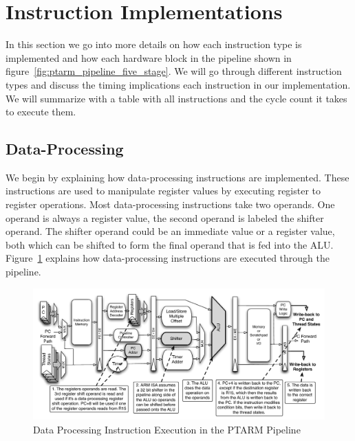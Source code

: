 \section{Instruction Implementations}
\label{sec:ptarm_instructions}
In this section we go into more details on how each instruction type is implemented and how each hardware block in the pipeline shown in figure~\ref{fig:ptarm_pipeline_five_stage}. 
We will go through different instruction types and discuss the timing implications each instruction in our implementation.
We will summarize with a table with all instructions and the cycle count it takes to execute them.
   
\subsection{Data-Processing}
We begin by explaining how data-processing instructions are implemented.
These instructions are used to manipulate register values by executing register to register operations. 
Most data-processing instructions take two operands.
One operand is always a register value, the second operand is labeled the shifter operand. 
The shifter operand could be an immediate value or a register value, both which can be shifted to form the final operand that is fed into the ALU.
Figure~\ref{fig:data_processing_pipeline_implementation} explains how data-processing instructions are executed through the pipeline.

\begin{figure}
  \vspace{-20pt}
  \begin{center}
    \includegraphics[scale=.54]{figs/data_processing_pipeline_implementation}
  \end{center}
  \vspace{-20pt}
  \caption{Data Processing Instruction Execution in the PTARM Pipeline}
  \label{fig:data_processing_pipeline_implementation}
\end{figure}

